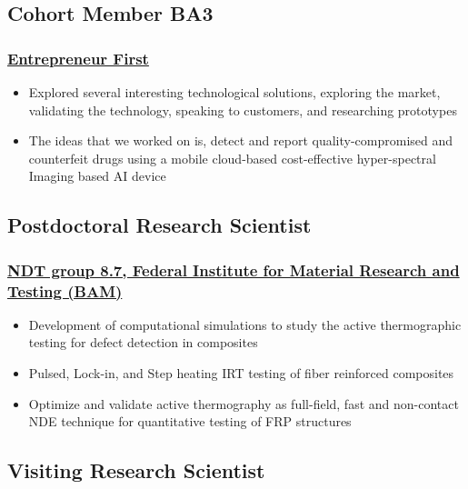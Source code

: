 \documentclass{my_cv}%
\begin{document}
\subsection{Cohort Member BA3}
\subsubsection{\href{https://www.joinef.com/}{Entrepreneur First}}
\begin{itemize}[leftmargin=0.15in]
\setlength\itemsep{-0.1em}
\color{mygray}
\item Explored several interesting technological solutions, exploring the market, validating the technology, speaking to customers, and researching prototypes
\item The ideas that we worked on is, detect and report quality-compromised and counterfeit drugs using a mobile cloud-based cost-effective hyper-spectral Imaging based AI device
\end{itemize}
{\color{mygray1} \hdashrule[0.1ex]{18.8cm}{0.2mm}{1mm}}
\subsection{Postdoctoral Research Scientist}
\subsubsection{\href{https://www.bam.de/Navigation/DE/Home/home.html}{NDT group 8.7, Federal Institute for Material Research and Testing (BAM)}}
\begin{itemize}[leftmargin=0.15in]
\setlength\itemsep{-0.1em}
\color{mygray}
\item Development of computational simulations to study the active thermographic testing for defect detection in composites
\item Pulsed, Lock-in, and Step heating IRT testing of fiber reinforced composites 
\item Optimize and validate active thermography as full-field, fast and non-contact NDE technique for quantitative testing of FRP structures
\end{itemize}
{\color{mygray1} \hdashrule[0.1ex]{18.8cm}{0.2mm}{1mm}}
\subsection{Visiting Research Scientist}
\end{document}
